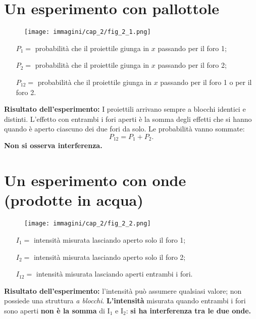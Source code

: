 \section*{Un esperimento con pallottole}
\begin{figure}[!htbp]
\begin{center}
\texttt{[image: immagini/cap\_2/fig\_2\_1.png]}
\end{center}
\end{figure}
\begin{itemize}
\item[$P_1=$ ]probabilità che il proiettile giunga in $x$ passando per il foro 1;
\item[$P_2=$ ]probabilità che il proiettile giunga in $x$ passando per il foro 2;
\item[$P_{12}=$ ]probabilità che il proiettile giunga in $x$ passando per il foro 1 o per il foro 2.
\end{itemize}
\textbf{Risultato dell'esperimento:} I proiettili arrivano sempre a blocchi identici e distinti. L'effetto con entrambi i fori aperti è la somma degli effetti che si hanno quando è aperto ciascuno dei due fori da solo. Le probabilità vanno sommate:
	\begin{equation}
	\boxed{
		P_{12}=P_1+P_2.
		}
\end{equation}
\textbf{Non si osserva interferenza.}
\newpage
\section*{Un esperimento con onde (prodotte in acqua)}
\begin{figure}[!htbp]
\begin{center}
\texttt{[image: immagini/cap\_2/fig\_2\_2.png]}
\end{center}
\end{figure}
\begin{itemize}
\item[$I_1=$ ]intensità misurata lasciando aperto solo il foro 1;
\item[$I_2=$ ]intensità misurata lasciando aperto solo il foro 2;
\item[$I_{12}=$ ]intensità misurata lasciando aperti entrambi i fori.
\end{itemize}
\textbf{Risultato dell'esperimento:} l'intensità  può assumere qualsiasi valore; non possiede una struttura \textit{a blocchi}. \textbf{L'intensità} misurata quando entrambi i fori sono aperti \textbf{non è la somma} di I$_1$ e I$_2$: \textbf{si ha interferenza tra le due onde.}
